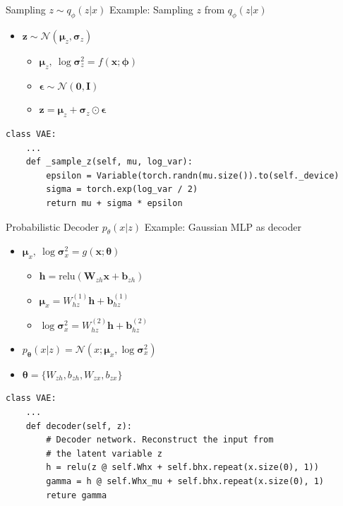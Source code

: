 \documentclass{beamer}
\newcommand{\relu}{\mathrm{relu}}
\begin{document}
\begin{frame}[fragile]{Sampling $z\sim q_\phi(z|x)$}
Example: Sampling $z$ from $q_\phi(z|x)$
\begin{itemize}
	\item $\mathbf{z}\sim \mathcal{N}(\bm{\mu}_z, \bm{\sigma}_z)$
	\begin{itemize}
		\item $\bm{\mu}_z,~\log\bm{\sigma}^2_z=f(\mathbf{x};\bm{\phi})$
		\item $\bm{\epsilon} \sim \mathcal{N}(\mathbf{0}, \mathbf{I})$
		\item $\mathbf{z} = \bm{\mu}_z + \bm{\sigma}_z \odot \bm{\epsilon} $
	\end{itemize}
\end{itemize}
\begin{verbatim}
class VAE:
    ...
    def _sample_z(self, mu, log_var):
        epsilon = Variable(torch.randn(mu.size()).to(self._device)
        sigma = torch.exp(log_var / 2)
        return mu + sigma * epsilon
\end{verbatim}
\end{frame}

\begin{frame}[fragile]{Probabilistic Decoder $p_\theta(x|z)$}
	Example: Gaussian MLP as decoder
	\begin{itemize}
		\item $\bm{\mu}_x,~\log\bm{\sigma}_x^2=g(\mathbf{x};\bm{\theta})$
		\begin{itemize}
			\item $\mathbf{h} = \relu\left(\mathbf{W}_{zh}\mathbf{x}+\mathbf{b}_{zh}\right)$
			\item $\bm{\mu}_x = W^{(1)}_{hz}\mathbf{h}+\mathbf{b}^{(1)}_{hz}$
			\item $\log \bm{\sigma}_x^2 = W^{(2)}_{hz}\mathbf{h}+\mathbf{b}^{(2)}_{hz}$
		\end{itemize}
		\item $p_{\bm{\theta}}(x|z)=\mathcal{N}(x;\bm{\mu}_x, \log\bm{\sigma}_x^2)$
		\item $\bm{\theta} = \{W_{zh}, b_{zh}, W_{zx}, b_{zx}\}$
	\end{itemize}
\begin{verbatim}
class VAE:
    ...
    def decoder(self, z):
        # Decoder network. Reconstruct the input from 
        # the latent variable z
        h = relu(z @ self.Whx + self.bhx.repeat(x.size(0), 1))  
        gamma = h @ self.Whx_mu + self.bhx.repeat(x.size(0), 1)      
        reture gamma
\end{verbatim}
\end{frame}
\end{document}
